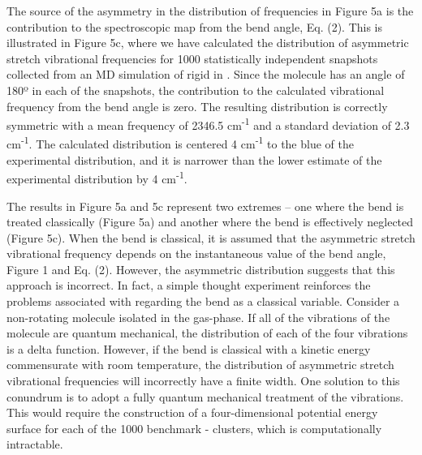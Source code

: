 \documentclass[]{article}
\begin{document}
The source of the asymmetry in the distribution of frequencies in Figure 5a is the contribution to the spectroscopic map from the  bend angle, Eq. (2). This is illustrated in Figure 5c, where we have calculated the distribution of  asymmetric stretch vibrational frequencies for 1000 statistically independent snapshots collected from an MD simulation of rigid  in \ce{[C4C1im][PF6]}.  Since the  molecule has an angle of 180º in each of the snapshots, the contribution to the calculated vibrational frequency from the  bend angle is zero. The resulting distribution is correctly symmetric with a mean frequency of 2346.5 cm\textsuperscript{-1} and a standard deviation of 2.3 cm\textsuperscript{-1}. The calculated distribution is centered 4 cm\textsuperscript{-1} to the blue of the experimental distribution, and it is narrower than the lower estimate of the experimental distribution by 4 cm\textsuperscript{-1}.

The results in Figure 5a and 5c represent two extremes -- one where the  bend is treated classically (Figure 5a) and another where the  bend is effectively neglected (Figure 5c).  When the  bend is classical, it is assumed that the  asymmetric stretch vibrational frequency depends on the instantaneous value of the bend angle, Figure 1 and Eq. (2).  However, the asymmetric distribution suggests that this approach is incorrect. In fact, a simple thought experiment reinforces the problems associated with regarding the  bend as a classical variable. Consider a non-rotating  molecule isolated in the gas-phase. If all of the vibrations of the  molecule are quantum mechanical, the distribution of each of the four vibrations is a delta function. However, if the bend is classical with a kinetic energy commensurate with room temperature, the distribution of asymmetric stretch vibrational frequencies will incorrectly have a finite width. One solution to this conundrum is to adopt a fully quantum mechanical treatment of the  vibrations. This would require the construction of a four-dimensional potential energy surface for each of the 1000 benchmark -\ce{[C4C1im][PF6]} clusters, which is computationally intractable.
\end{document}
